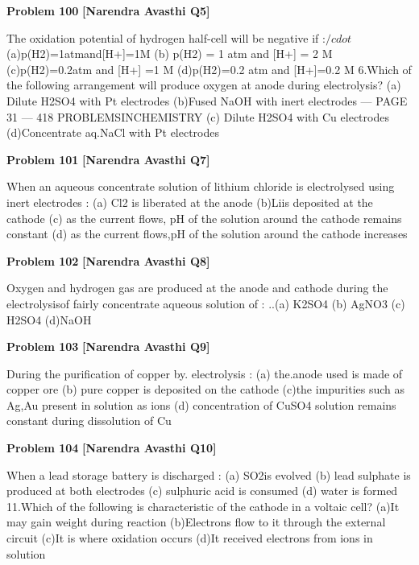 \begin{problembox}
\textbf{Problem 100} \hfill \textbf{[Narendra Avasthi Q5]}
\label{q:ext-narendra_avasthi_all_questions-100}

The oxidation potential of hydrogen half-cell will be negative if :$/cdot$
(a)p(H2)=1atmand[H+]=1M
(b) p(H2) = 1 atm and [H+] = 2 M
(c)p(H2)=0.2atm and [H+] =1 M
(d)p(H2)=0.2 atm and [H+]=0.2 M
6.Which of the following arrangement will produce oxygen at anode during electrolysis?
(a) Dilute H2SO4 with Pt electrodes
(b)Fused NaOH with inert electrodes
--- PAGE 31 ---
418
PROBLEMSINCHEMISTRY
(c) Dilute H2SO4 with Cu electrodes
(d)Concentrate aq.NaCl with Pt electrodes
\end{problembox}

\begin{problembox}
\textbf{Problem 101} \hfill \textbf{[Narendra Avasthi Q7]}
\label{q:ext-narendra_avasthi_all_questions-101}

When an aqueous concentrate solution of lithium chloride is electrolysed using inert
electrodes :
(a) Cl2 is liberated at the anode
(b)Liis deposited at the cathode
(c) as the current flows, pH of the solution around the cathode remains constant
(d) as the current flows,pH of the solution around the cathode increases
\end{problembox}

\begin{problembox}
\textbf{Problem 102} \hfill \textbf{[Narendra Avasthi Q8]}
\label{q:ext-narendra_avasthi_all_questions-102}

Oxygen and hydrogen gas are produced at the anode and cathode during the electrolysisof
fairly concentrate aqueous solution of :
..(a) K2SO4
(b) AgNO3
(c) H2SO4
(d)NaOH
\end{problembox}

\begin{problembox}
\textbf{Problem 103} \hfill \textbf{[Narendra Avasthi Q9]}
\label{q:ext-narendra_avasthi_all_questions-103}

During the purification of copper by. electrolysis :
(a) the.anode used is made of copper ore
(b) pure copper is deposited on the cathode
(c)the impurities such as Ag,Au present in solution as ions
(d) concentration of CuSO4 solution remains constant during dissolution of Cu
\end{problembox}

\begin{problembox}
\textbf{Problem 104} \hfill \textbf{[Narendra Avasthi Q10]}
\label{q:ext-narendra_avasthi_all_questions-104}

When a lead storage battery is discharged :
(a) SO2is evolved
(b) lead sulphate is produced at both electrodes
(c) sulphuric acid is consumed
(d) water is formed
11.Which of the following is characteristic of the cathode in a voltaic cell?
(a)It may gain weight during reaction
(b)Electrons flow to it through the external circuit
(c)It is where oxidation occurs
(d)It received electrons from ions in solution
\end{problembox}

